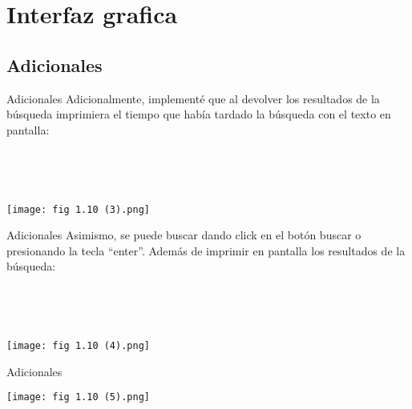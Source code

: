 \section{Interfaz grafica}

\subsection{Adicionales}
\begin{frame}{Adicionales}
    Adicionalmente, implementé que al devolver los resultados de la búsqueda imprimiera el tiempo que había
tardado la búsqueda con el texto en pantalla:

\pause

\

\

\begin{center}
    \texttt{[image: fig 1.10 (3).png]}
\end{center}
\end{frame}

\begin{frame}{Adicionales}
    Asimismo, se puede buscar dando click en el botón buscar o presionando la tecla “enter”.
    Además de imprimir en pantalla los resultados de la búsqueda:

\pause

\

\

\begin{center}
    \texttt{[image: fig 1.10 (4).png]}
\end{center}
\end{frame}

\begin{frame}{Adicionales}
    \begin{center}
        \texttt{[image: fig 1.10 (5).png]}
    \end{center}
\end{frame}